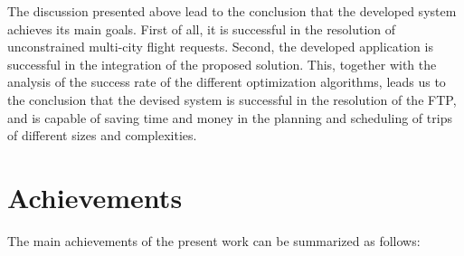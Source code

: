 
The discussion presented above lead to the conclusion that the developed system achieves its main goals. First of all, it is successful in the resolution of unconstrained multi-city flight requests. Second, the developed application is successful in the integration of the proposed solution.
This, together with the analysis of the success rate of the different optimization algorithms, leads us to the conclusion that the devised system is successful in the resolution of the FTP, and is capable of saving time and money in the planning and scheduling of trips of different sizes and complexities.



\section{Achievements}

The main achievements of the present work can be summarized as follows:

